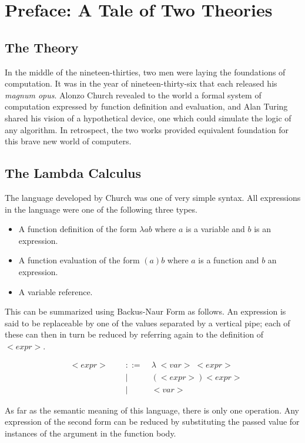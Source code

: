
\chapter{Preface: A Tale of Two Theories}
\section{The Theory}
In the middle of the nineteen-thirties, two men were laying the foundations of 
computation. It was in the year of nineteen-thirty-six that each released his 
\emph{magnum opus}. Alonzo Church revealed to the world a formal system of computation 
expressed by function definition and evaluation, and Alan Turing shared his vision 
of a hypothetical device, one which could simulate the logic of any algorithm. In 
retrospect, the two works provided equivalent foundation for this brave new world 
of computers.

\section{The Lambda Calculus}
The language developed by Church was one of very simple syntax. All expressions in 
the language were one of the following three types.

\begin{itemize}
  \item A function definition of the form $\lambda a b$ where $a$ is a variable and $b$ is an expression.
  \item A function evaluation of the form $(a)b$ where $a$ is a function and $b$ an expression.
  \item A variable reference.
\end{itemize}

This can be summarized using Backus-Naur Form as follows. An expression is said to 
be replaceable by one of the values separated by a vertical pipe; each of these 
can then in turn be reduced by referring again to the definition of $<expr>$.

\begin{figure}[ht]
\caption{}\label{}
\begin{align*}
& <expr> \; &::= \; &\lambda \; <var> \; <expr>
\\& \qquad \qquad \qquad &| \; &(<expr>)<expr>
\\& \qquad \qquad \qquad &| \; &<var>
\end{align*}
\end{figure}

As far as the semantic meaning of this language, there is only one operation. Any 
expression of the second form can be reduced by substituting the passed value for 
instances of the argument in the function body.

